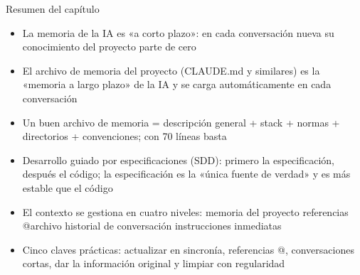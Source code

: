 \begin{tcbsummary}{Resumen del capítulo}
\begin{itemize}
  \item La memoria de la IA es «a corto plazo»: en cada conversación nueva su conocimiento del proyecto parte de cero
  \item El archivo de memoria del proyecto (CLAUDE.md y similares) es la «memoria a largo plazo» de la IA y se carga automáticamente en cada conversación
  \item Un buen archivo de memoria = descripción general + stack + normas + directorios + convenciones; con 70 líneas basta
  \item Desarrollo guiado por especificaciones (SDD): primero la especificación, después el código; la especificación es la «única fuente de verdad» y es más estable que el código
  \item El contexto se gestiona en cuatro niveles: memoria del proyecto referencias @archivo historial de conversación instrucciones inmediatas
  \item Cinco claves prácticas: actualizar en sincronía, referencias @, conversaciones cortas, dar la información original y limpiar con regularidad
\end{itemize}

\end{tcbsummary}
